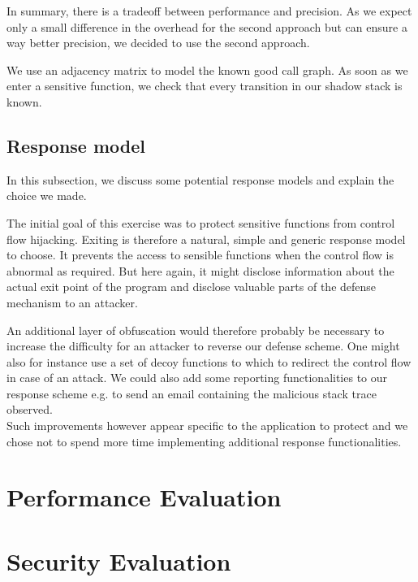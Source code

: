 \documentclass{llncs}
\begin{document}
In summary, there is a tradeoff between performance and precision. As we expect only a small difference in the overhead for the second approach but can ensure a way better precision, we decided to use the second approach.

We use an adjacency matrix to model the known good call graph. As soon as we enter a sensitive function, we check that every transition in our shadow stack is known.

\subsection{Response model}
In this subsection, we discuss some potential response models and explain the choice we made.

The initial goal of this exercise was to protect sensitive functions from control flow hijacking. Exiting is therefore a natural, simple and generic response model to choose. It prevents the access to sensible functions when the control flow is abnormal as required. But here again, it might disclose information about the actual exit point of the program and disclose valuable parts of the defense mechanism to an attacker.

An additional layer of obfuscation would therefore probably be necessary to increase the difficulty for an attacker to reverse our defense scheme. One might also for instance use a set of decoy functions to which to redirect the control flow in case of an attack. We could also add some reporting functionalities to our response scheme e.g. to send an email containing the malicious stack trace observed.\\
Such improvements however appear specific to the application to protect and we chose not to spend more time implementing additional response functionalities.

\section{Performance Evaluation}
\section{Security Evaluation}
\end{document}
